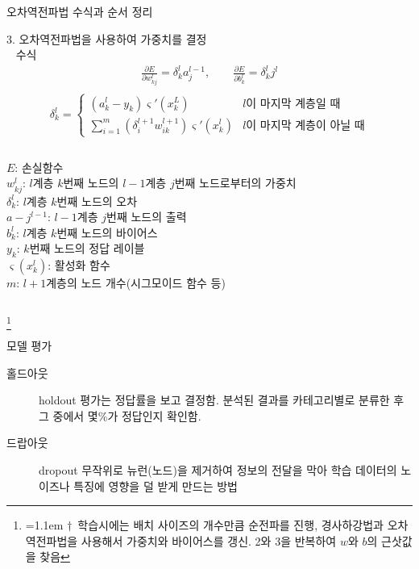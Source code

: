 \documentclass[10pt,t]{beamer}
\newcommand\blfootnote[1]{%
  \begingroup
  \renewcommand\thefootnote{}\footnote{\hspace{-0.5em}\hangindent=1.1em $\dagger$~#1}%
  \addtocounter{footnote}{-1}%
  \endgroup
}
\begin{document}
\begin{frame} {오차역전파법 수식과 순서 정리}
    \pagebreak
    \begin{alertblock}{3. 오차역전파법을 사용하여 가중치를 결정\\~}
        수식
        \begin{eqnarray*}
            \frac{\partial E}{\partial w_{kj}^l} = \delta_k^l a_j^{l-1} ,
            \qquad \frac{\partial E}{\partial b_k^l} = \delta_k^l j^{l} \\
        \end{eqnarray*}
        \[
            \delta_k^l = 
           \begin{cases}
            (a_k^l - y_k)\varsigma'(x_k^L) & l \text{이 마지막 계층일 때}\\
            \sum_{i=1}^m (\delta_i^{l+1}w_{ik}^{l+1})\varsigma'(x_k^l) & l \text{이 마지막 계층이 아닐 때}
         \end{cases}
        \]

        {\footnotesize
        \begin{columns}
            $E$: 손실함수\\
            $w_{kj}^l$: $l$계층 $k$번째 노드의 $l-1$계층 $j$번째 노드로부터의 가중치\\
            $\delta_k^l$: $l$계층 $k$번째 노드의 오차\\
            $a-j^{l-1}$: $l-1$계층 $j$번째 노드의 출력\\
            $b_k^l$: $l$계층 $k$번째 노드의 바이어스\\
            $y_k$: $k$번째 노드의 정답 레이블\\
            $\varsigma(x_k^l)$: 활성화 함수\\
            $m$: $l+1$계층의 노드 개수(시그모이드 함수 등)
        \end{columns}
        }
        
    \end{alertblock}

    \blfootnote{학습시에는 배치 사이즈의 개수만큼 순전파를 진행, 경사하강법과 오차역전파법을 사용해서 가중치와 바이어스를 갱신. 2와 3을 반복하여 $w$와 $b$의 근삿값을 찾음}
\end{frame}

\begin{frame}[fragile]{모델 평가}
    \begin{description}
        \item[홀드아웃] holdout 평가는 정답률을 보고 결정함. 분석된 결과를 카테고리별로 분류한 후 그 중에서 몇\%가 정답인지 확인함.  
        \item[드랍아웃] dropout 무작위로 뉴런(노드)을 제거하여 정보의 전달을 막아 학습 데이터의 노이즈나 특징에 영향을 덜 받게 만드는 방법
    \end{description}
\end{frame}
\end{document}
